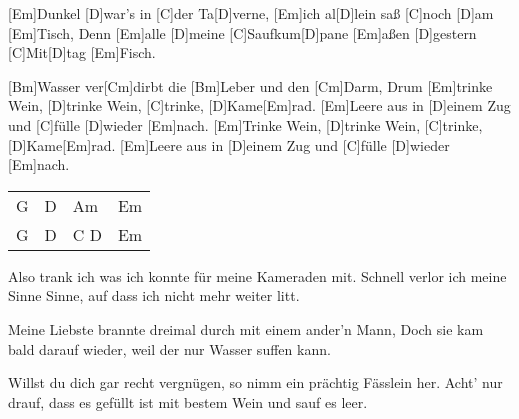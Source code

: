 

\begin{guitar}
	[Em]Dunkel [D]war's in [C]der Ta[D]verne, [Em]ich al[D]lein saß [C]noch [D]am [Em]Tisch,
	Denn [Em]alle [D]meine [C]Saufkum[D]pane [Em]aßen [D]gestern [C]Mit[D]tag [Em]Fisch.
	
	[Bm]Wasser ver[Cm]dirbt die [Bm]Leber und den [Cm]Darm,
	Drum [Em]trinke Wein, [D]trinke Wein, [C]trinke, [D]Kame[Em]rad.
	[Em]Leere aus in [D]einem Zug und [C]fülle [D]wieder [Em]nach.
	[Em]Trinke Wein, [D]trinke Wein, [C]trinke, [D]Kame[Em]rad.
	[Em]Leere aus in [D]einem Zug und [C]fülle [D]wieder [Em]nach.
	
	{\footnotesize\begin{tabular}{l|l|l|l}
			G & D & Am & Em \\
			G & D & C D & Em
	\end{tabular}}
	
	Also trank ich was ich konnte für meine Kameraden mit.
	Schnell verlor ich meine Sinne Sinne, auf dass ich nicht mehr weiter litt.
	
	 
	
	
	Meine Liebste brannte dreimal durch mit einem ander'n Mann,
	Doch sie kam bald darauf wieder, weil der nur Wasser suffen kann.
	
	 
	
	
	Willst du dich gar recht vergnügen, so nimm ein prächtig Fässlein her.
	Acht' nur drauf, dass es gefüllt ist mit bestem Wein und sauf es leer.
	
	 
\end{guitar}




